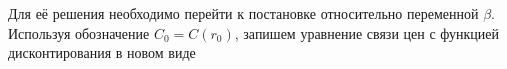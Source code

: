 \documentclass[10pt]{article}
\theoremstyle{definition}
\theoremstyle{remark}
\theoremstyle{plain}
\newcommand{\wt}{\widetilde}
\newcommand{\diag}{\mathrm{diag}}
\begin{document}
%
%
 Для её решения необходимо перейти к постановке относительно переменной $\beta$. Используя обозначение $C_0 = C(r_0)$, запишем уравнение связи цен с функцией дисконтирования в новом виде
\end{document}
